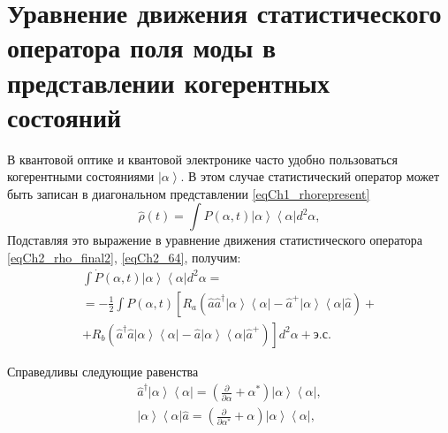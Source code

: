 \section{Уравнение движения статистического оператора поля моды в
  представлении когерентных состояний}
В квантовой оптике и квантовой электронике часто удобно пользоваться
когерентными состояниями $\left|\alpha\right>$.  В этом случае
статистический оператор может быть записан в диагональном
представлении \eqref{eqCh1_rhorepresent}  
\begin{equation}
\hat{\rho}\left(t\right) = \int
P\left(\alpha, t\right)\left|\alpha\right>\left<\alpha\right| d^2 \alpha,
\label{eqCh2_65}
\end{equation}
Подставляя это выражение в уравнение движения статистического
оператора \eqref{eqCh2_rho_final2}, \ref{eqCh2_64}, получим: 
\begin{eqnarray}
\int \dot{P}\left(\alpha, t\right)\left|\alpha\right>\left<\alpha\right|
d^2 \alpha  = 
\nonumber \\
= -\frac{1}{2}\int P\left(\alpha, t\right)\left[R_a
\left(\hat{a}\hat{a}^{\dag}\left|\alpha\right>\left<\alpha\right|-\hat{a}^{+}\left|\alpha\right>\left<\alpha\right|\hat{a}\right)
\right. +
\nonumber \\
+
\left.
R_b
\left(\hat{a}^{\dag}\hat{a}\left|\alpha\right>\left<\alpha\right|-\hat{a}\left|\alpha\right>\left<\alpha\right|\hat{a}^{+}\right)
\right]d^2 \alpha +\mbox{э.с.}
\label{eqCh2_66}
\end{eqnarray}

Справедливы следующие равенства
\begin{eqnarray}
\hat{a}^{\dag}\left|\alpha\right>\left<\alpha\right| = 
\left(\frac{\partial}{\partial \alpha} +
\alpha^{*}\right)\left|\alpha\right>\left<\alpha\right|, 
\nonumber \\
\left|\alpha\right>\left<\alpha\right|\hat{a} = 
\left(\frac{\partial}{\partial \alpha^{*}} +
\alpha\right)\left|\alpha\right>\left<\alpha\right|, 
\label{eqCh2_67}
\end{eqnarray}

